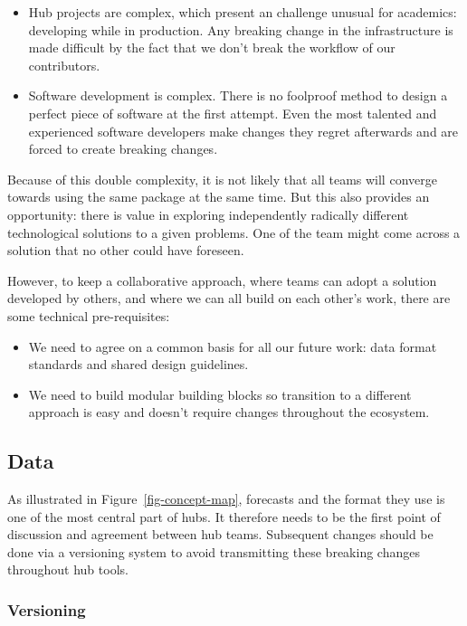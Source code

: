\documentclass[
  letterpaper,
  DIV=11,
  numbers=noendperiod]{scrartcl}
\providecommand{\tightlist}{%
  \setlength{\itemsep}{0pt}\setlength{\parskip}{0pt}}
\begin{document}
\begin{itemize}
\tightlist
\item
  Hub projects are complex, which present an challenge unusual for
  academics: developing while in production. Any breaking change in the
  infrastructure is made difficult by the fact that we don't break the
  workflow of our contributors.
\item
  Software development is complex. There is no foolproof method to
  design a perfect piece of software at the first attempt. Even the most
  talented and experienced software developers make changes they regret
  afterwards and are forced to create breaking changes.
\end{itemize}

Because of this double complexity, it is not likely that all teams will
converge towards using the same package at the same time. But this also
provides an opportunity: there is value in exploring independently
radically different technological solutions to a given problems. One of
the team might come across a solution that no other could have foreseen.

However, to keep a collaborative approach, where teams can adopt a
solution developed by others, and where we can all build on each other's
work, there are some technical pre-requisites:

\begin{itemize}
\tightlist
\item
  We need to agree on a common basis for all our future work: data
  format standards and shared design guidelines.
\item
  We need to build modular building blocks so transition to a different
  approach is easy and doesn't require changes throughout the ecosystem.
\end{itemize}

\hypertarget{data}{%
\subsection{Data}\label{data}}

As illustrated in Figure~\ref{fig-concept-map}, forecasts and the format
they use is one of the most central part of hubs. It therefore needs to
be the first point of discussion and agreement between hub teams.
Subsequent changes should be done via a versioning system to avoid
transmitting these breaking changes throughout hub tools.

\hypertarget{versioning}{%
\subsubsection{Versioning}\label{versioning}}
\end{document}
